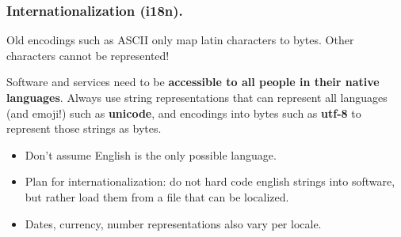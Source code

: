 \documentclass{beamer} %
\newcommand\emc[1]{\textcolor{midred}{\textbf{#1}}}
\begin{document}
\begin{frame}
\frametitle{Internationalization (i18n).}

Old encodings such as ASCII only map latin characters to bytes. Other characters cannot be represented!

\vspace{3mm}
Software and services need to be \emc{accessible to all people in their native languages}. Always use string representations that can represent all languages (and emoji!) such as \emc{unicode}, and encodings into bytes such as \emc{utf-8} to represent those strings as bytes.

\begin{itemize}
\item Don't assume English is the only possible language.
\item Plan for internationalization: do not hard code english strings into software, but rather load them from a file that can be localized.
\item Dates, currency, number representations also vary per locale.
\end{itemize}

\end{frame}


\end{document}
